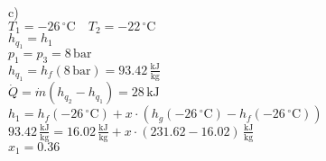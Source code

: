 c) \\
$T_1 = -26 \, ^\circ \text{C} \quad T_2 = -22 \, ^\circ \text{C}$ \\
$h_{q_1} = h_1$ \\
$p_1 = p_3 = 8 \, \text{bar}$ \\
$h_{q_1} = h_f (8 \, \text{bar}) = 93.42 \, \frac{\text{kJ}}{\text{kg}}$ \\

$\dot{Q} = \dot{m} (h_{q_2} - h_{q_1}) = 28 \, \text{kJ}$ \\

$h_1 = h_f (-26 \, ^\circ \text{C}) + x \cdot (h_g (-26 \, ^\circ \text{C}) - h_f (-26 \, ^\circ \text{C}))$ \\

$93.42 \, \frac{\text{kJ}}{\text{kg}} = 16.02 \, \frac{\text{kJ}}{\text{kg}} + x \cdot (231.62 - 16.02) \, \frac{\text{kJ}}{\text{kg}}$ \\

$x_1 = 0.36$ \\